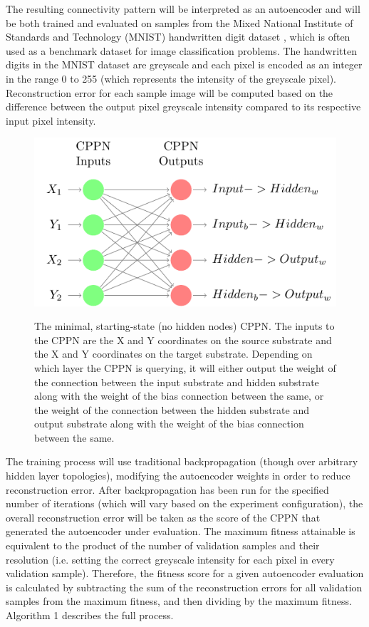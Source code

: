 \documentclass{acm_proc_article-sp}
\begin{document}
The resulting connectivity pattern will be interpreted as an autoencoder and will be both trained and evaluated on samples from the Mixed National Institute of Standards and Technology (MNIST) handwritten digit dataset \cite{mnistdataset}, which is often used as a benchmark dataset for image classification problems.  The handwritten digits in the MNIST dataset are greyscale and each pixel is encoded as an integer in the range 0 to 255 (which represents the intensity of the greyscale pixel).  Reconstruction error for each sample image will be computed based on the difference between the output pixel greyscale intensity compared to its respective input pixel intensity. 

\begin{figure}[h]
	\caption{The minimal, starting-state (no hidden nodes) CPPN.  The inputs to the CPPN are the X and Y coordinates on the source substrate and the X and Y coordinates on the target substrate.  Depending on which layer the CPPN is querying, it will either output the weight of the connection between the input substrate and hidden substrate along with the weight of the bias connection between the same, or the weight of the connection between the hidden substrate and output substrate along with the weight of the bias connection between the same.}
	\centering
	\includegraphics[scale=0.8]{MinimalCppn/MinimalCppn}
	\label{figure:autoencodercppn}
\end{figure}

The training process will use traditional backpropagation (though over arbitrary hidden layer topologies), modifying the autoencoder weights in order to reduce reconstruction error.  After backpropagation has been run for the specified number of iterations (which will vary based on the experiment configuration), the overall reconstruction error will be taken as the score of the CPPN that generated the autoencoder under evaluation.  The maximum fitness attainable is equivalent to the product of the number of validation samples and their resolution (i.e. setting the correct greyscale intensity for each pixel in every validation sample).  Therefore, the fitness score for a given autoencoder evaluation is calculated by subtracting the sum of the reconstruction errors for all validation samples from the maximum fitness, and then dividing by the maximum fitness.  Algorithm 1 describes the full process.
\end{document}
